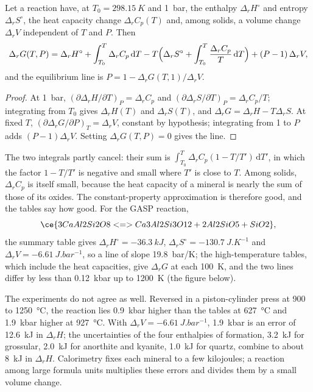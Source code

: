 \begin{theorem}\label{thm:b3:petrological-thermodynamics:dg}
Let a reaction have, at $T_0 = \qty{298.15}{K}$ and \qty{1}{bar}, the
enthalpy $\Delta_rH^\circ$ and entropy $\Delta_rS^\circ$, the heat capacity
change $\Delta_rC_p(T)$ and, among solids, a volume change $\Delta_rV$
independent of $T$ and $P$. Then
\[
  \Delta_rG(T, P) = \Delta_rH^\circ + \int_{T_0}^{T}\Delta_rC_p\,\mathrm dT
  - T\Bigl(\Delta_rS^\circ + \int_{T_0}^{T}\frac{\Delta_rC_p}{T}\,\mathrm dT\Bigr)
  + (P - 1)\,\Delta_rV ,
\]
and the equilibrium line is $P = 1 - \Delta_rG(T, 1)/\Delta_rV$.
\end{theorem}

\begin{proof}
At \qty{1}{bar}, $(\partial\Delta_rH/\partial T)_P = \Delta_rC_p$ and
$(\partial\Delta_rS/\partial T)_P = \Delta_rC_p/T$; integrating from $T_0$
gives $\Delta_rH(T)$ and $\Delta_rS(T)$, and $\Delta_rG = \Delta_rH -
T\Delta_rS$. At fixed $T$, $(\partial\Delta_rG/\partial P)_T = \Delta_rV$,
constant by hypothesis; integrating from 1 to $P$ adds $(P - 1)\Delta_rV$.
Setting $\Delta_rG(T, P) = 0$ gives the line.
\end{proof}

The two integrals partly cancel: their sum is $\int_{T_0}^T\Delta_rC_p(1 -
T/T')\,\mathrm dT'$, in which the factor $1 - T/T'$ is negative and small
where $T'$ is close to $T$. Among solids, $\Delta_rC_p$ is itself small,
because the heat capacity of a mineral is nearly the sum of those of its
oxides. The constant-property approximation is therefore good, and the
tables say how good. For the GASP reaction,
\[
  \ce{3 CaAl2Si2O8 <=> Ca3Al2Si3O12 + 2 Al2SiO5 + SiO2},
\]
the summary table gives $\Delta_rH^\circ = \qty{-36.3}{kJ}$,
$\Delta_rS^\circ = \qty{-130.7}{J.K^{-1}}$ and $\Delta_rV =
\qty{-6.61}{J.bar^{-1}}$, so a line of slope \qty{19.8}{bar/K}; the
high-temperature tables, which include the heat capacities, give
$\Delta_rG$ at each \qty{100}{K}, and the two lines differ by less than
\qty{0.12}{kbar} up to \qty{1200}{K} (the figure below).

The experiments do not agree as well. Reversed in a piston-cylinder press at
900 to \qty{1250}{\celsius}, the reaction lies \qty{0.9}{kbar} higher than the
tables at \qty{627}{\celsius} and \qty{1.9}{kbar} higher at
\qty{927}{\celsius}. With $\Delta_rV = \qty{-6.61}{J.bar^{-1}}$,
\qty{1.9}{kbar} is an error of \qty{12.6}{kJ} in $\Delta_rH$; the
uncertainties of the four enthalpies of formation, \qty{3.2}{kJ} for
grossular, \qty{2.0}{kJ} for anorthite and kyanite, \qty{1.0}{kJ} for
quartz, combine to about \qty{8}{kJ} in $\Delta_rH$. Calorimetry fixes each
mineral to a few kilojoules; a reaction among large formula units multiplies
these errors and divides them by a small volume change.

